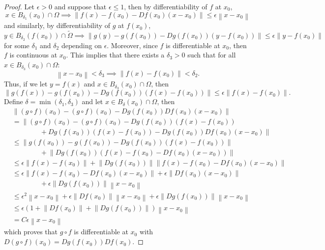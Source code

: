 \documentclass{article}
\theoremstyle{plain}
\theoremstyle{definition}
\newcommand{\norm}[1]{\left\lVert#1 \right\rVert}
\begin{document}
\begin{proof} 
    Let $\epsilon > 0$ and suppose that $\epsilon \leq 1$, then by differentiability of $f$ at $x_0$,
    $$x \in B_{\delta_1}(x_0)\cap \Omega \implies \norm{f(x) - f(x_0) - Df(x_0)(x - x_0)} \leq \epsilon \norm{x - x_0}$$
    and similarly, by differentiability of $g$ at $f(x_0)$,
    $$y \in B_{\delta_2}(f(x_0))\cap \tilde{\Omega} \implies \norm{g(y) - g(f(x_0)) - Dg(f(x_0))(y - f(x_0))} \leq \epsilon \norm{y - f(x_0)}$$
    for some $\delta_1$ and $\delta_2$ depending on $\epsilon$. Moreover, since $f$ is differentiable at $x_0$, then $f$ is continuous at $x_0$. This implies that there exists a $\delta_3 > 0$ such that for all $x \in B_{\delta_3}(x_0) \cap \Omega$:
    $$\norm{x - x_0} < \delta_3 \implies \norm{f(x) - f(x_0)} < \delta_2.$$
    Thus, if we let $y = f(x)$ and $x \in B_{\delta_3}(x_0) \cap \Omega$, then
    $$\norm{g(f(x)) - g(f(x_0)) - Dg(f(x_0))(f(x) - f(x_0))} \leq \epsilon \norm{f(x) - f(x_0)}.$$
    Define $\delta = \min(\delta_1, \delta_3)$ and let $x \in B_{\delta}(x_0) \cap \Omega$, then
    \begin{align*}
        & \norm{(g\circ f)(x_0) - (g \circ f)(x_0) - Dg(f(x_0))Df(x_0)(x - x_0)} \\
        &= \lVert(g\circ f)(x_0) - (g \circ f)(x_0)  - Dg(f(x_0))(f(x) - f(x_0)) \\
        &\qquad \qquad  + Dg(f(x_0))(f(x) - f(x_0)) - Dg(f(x_0))Df(x_0)(x - x_0)\lVert  \\
        &\leq \norm{g(f(x_0)) - g(f(x_0))  - Dg(f(x_0))(f(x) - f(x_0))} \\
        &\qquad \qquad + \norm{Dg(f(x_0))(f(x) - f(x_0) - Df(x_0)(x - x_0))} \\
        &\leq \epsilon \norm{f(x) - f(x_0)} + \norm{Dg(f(x_0))} \norm{f(x) - f(x_0) - Df(x_0)(x - x_0)} \\
        &\leq \epsilon \norm{f(x) - f(x_0) - Df(x_0)(x - x_0)} + \epsilon \norm{Df(x_0)(x - x_0)} \\
        &\qquad \qquad + \epsilon \norm{Dg(f(x_0))}\norm{x - x_0} \\
        &\leq \epsilon^2 \norm{x - x_0} + \epsilon \norm{Df(x_0)}\norm{x - x_0} + \epsilon \norm{Dg(f(x_0))}\norm{x - x_0} \\
        &\leq \epsilon(1 + \norm{Df(x_0)} + \norm{Dg(f(x_0))})\norm{x - x_0} \\
        &= C \epsilon \norm{x - x_0}
    \end{align*}
    which proves that $g \circ f$ is differentiable at $x_0$ with $D(g\circ f)(x_0) = Dg(f(x_0))Df(x_0)$. 
\end{proof}
\end{document}
